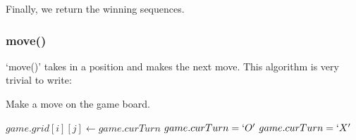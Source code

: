 \documentclass{article}
\begin{document}
Finally, we return the winning sequences.

\subsubsection{move()}

`move()' takes in a position and makes the next move. This algorithm is very trivial to write:

\begin{algorithm}
\caption{Make a move on the game board.}

\begin{algorithmic}[1]
\State $game.grid[i][j] \gets game.curTurn$
  \State $game.curTurn = `O'$
  \State $game.curTurn = `X'$
\EndIf
\EndProcedure
\end{algorithmic}
\end{algorithm}
\end{document}
